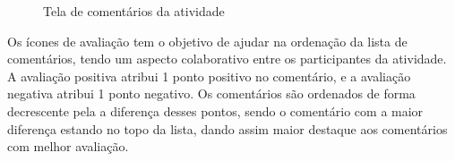 \begin{figure}[H]
    \centering
    \caption{Tela de comentários da atividade}
    \label{fig:audiencia10}
\end{figure}

Os ícones de avaliação tem o objetivo de ajudar na ordenação da lista de comentários, tendo um aspecto colaborativo entre os participantes da atividade. A avaliação positiva atribui 1 ponto positivo no comentário, e a avaliação negativa atribui 1 ponto negativo. Os comentários são ordenados de forma decrescente pela a diferença desses pontos, sendo o comentário com a maior diferença estando no topo da lista, dando assim maior destaque aos comentários com melhor avaliação.

